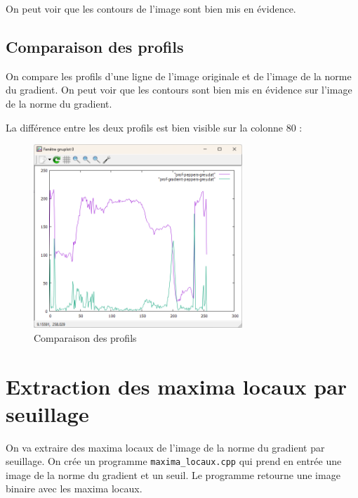 \documentclass[french,a4paper,10pt]{article}
\begin{document}
    On peut voir que les contours de l'image sont bien mis en évidence.

    \newpage
    \subsection{Comparaison des profils}\label{subsec:1.2}

    On compare les profils d'une ligne de l'image originale et de l'image de la norme du gradient.
    On peut voir que les contours sont bien mis en évidence sur l'image de la norme du gradient.

    La différence entre les deux profils est bien visible sur la colonne 80 : %
    \begin{figure}[!htb]
        \centering
        \includegraphics[width=0.7\textwidth]{out/prof-peppers-grey-gradient}
        \caption{Comparaison des profils}\label{fig:profiles}
    \end{figure}

    \newpage
    \section{Extraction des maxima locaux par seuillage}\label{sec:2}

    On va extraire des maxima locaux de l'image de la norme du gradient par seuillage.
    On crée un programme \texttt{maxima\_locaux.cpp} qui prend en entrée une image de la norme du gradient et un seuil.
    Le programme retourne une image binaire avec les maxima locaux.
\end{document}
